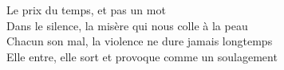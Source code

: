 Le prix du temps, et pas un mot \\
Dans le silence, la misère qui nous colle à la peau \\
Chacun son mal, la violence ne dure jamais longtemps \\
Elle entre, elle sort et provoque comme un soulagement
